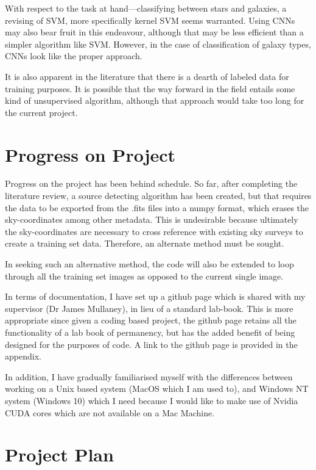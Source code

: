 \documentclass[a4paper,11pt]{article}
\begin{document}
With respect to the task at hand—classifying between stars and galaxies, a revising of SVM, more specifically kernel SVM seems warranted. Using CNNs may also bear fruit in this endeavour, although that may be less efficient than a simpler algorithm like SVM. However, in the case of classification of galaxy types, CNNs look like the proper approach.

It is also apparent in the literature that there is a dearth of labeled data for training purposes. It is possible that the way forward in the field entails some kind of unsupervised algorithm, although that approach would take too long for the current project. 

\newpage


\section{Progress on Project}
Progress on the project has been behind schedule. So far, after completing the literature review, a source detecting algorithm has been created, but that requires the data to be exported from the .fits files into a numpy format, which erases the sky-coordinates among other metadata. This is undesirable because ultimately the sky-coordinates are necessary to cross reference with existing sky surveys to create a training set data. Therefore, an alternate method must be sought. 

In seeking such an alternative method, the code will also be extended to loop through all the training set images as opposed to the current single image. 

In terms of documentation, I have set up a github page which is shared with my supervisor (Dr James Mullaney), in lieu of a standard lab-book. This is more appropriate since given a coding based project, the github page retains all the functionality of a lab book of permanency, but has the added benefit of being designed for the purposes of code. A link to the github page is provided in the appendix.

In addition, I have gradually familiarised myself with the differences between working on a Unix based system (MacOS which I am used to), and Windows NT system (Windows 10) which I need because I would like to make use of Nvidia CUDA cores which are not available on a Mac Machine.

\section{Project Plan}
\end{document}
